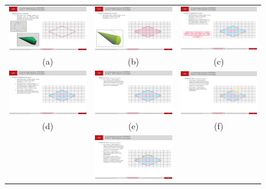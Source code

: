 \begin{figure}[ht!]
    \centering
    \begin{tabular}{ccc}
        \includegraphics[width=0.3\linewidth]{chapter3_numerical_methods/pictures/ibm1.pdf} &
        \includegraphics[width=0.3\linewidth]{chapter3_numerical_methods/pictures/ibm2.pdf} &
        \includegraphics[width=0.3\linewidth]{chapter3_numerical_methods/pictures/ibm3.pdf} \\[0.4em]
        (a) & (b) & (c) \\
        \includegraphics[width=0.3\linewidth]{chapter3_numerical_methods/pictures/ibm4.pdf} &
        \includegraphics[width=0.3\linewidth]{chapter3_numerical_methods/pictures/ibm5.pdf} &
        \includegraphics[width=0.3\linewidth]{chapter3_numerical_methods/pictures/ibm6.pdf} \\
        (d) & (e) & (f) \\
        & \includegraphics[width=0.3\linewidth]{chapter3_numerical_methods/pictures/ibm7.pdf} & \\

\end{tabular}
\end{figure}
